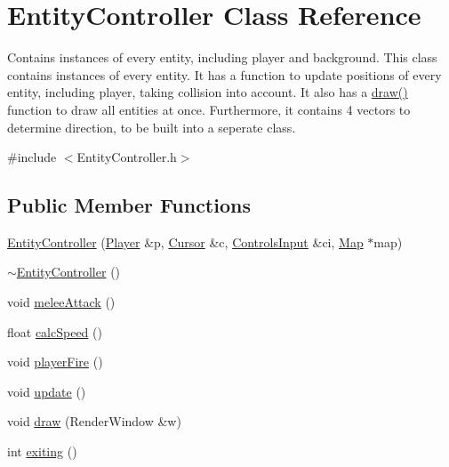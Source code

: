 \hypertarget{class_entity_controller}{}\section{Entity\+Controller Class Reference}
\label{class_entity_controller}


Contains instances of every entity, including player and background. This class contains instances of every entity. It has a function to update positions of every entity, including player, taking collision into account. It also has a \hyperlink{class_entity_controller_a82e17378b1553449be6f93a8c18eefee}{draw()} function to draw all entities at once. Furthermore, it contains 4 vectors to determine direction, to be built into a seperate class.  




{\ttfamily \#include $<$Entity\+Controller.\+h$>$}

\subsection*{Public Member Functions}
\begin{DoxyCompactItemize}
\item 
\hyperlink{class_entity_controller_a2d81c913c30dc661d101c945d67b73b7}{Entity\+Controller} (\hyperlink{class_player}{Player} \&p, \hyperlink{class_cursor}{Cursor} \&c, \hyperlink{struct_controls_input}{Controls\+Input} \&ci, \hyperlink{class_map}{Map} $\ast$map)
\item 
\hyperlink{class_entity_controller_ad55bccfe26fd9a5486a749b2b49a0478}{$\sim$\+Entity\+Controller} ()
\item 
void \hyperlink{class_entity_controller_a8f0223a1a43a2369bc81dd53aadf251c}{melee\+Attack} ()
\item 
float \hyperlink{class_entity_controller_ab847c4e0ddefc7f23b2993c4cdc825a4}{calc\+Speed} ()
\item 
void \hyperlink{class_entity_controller_a1b1859bc8e5bfa72a0f1f34be3b1d5bd}{player\+Fire} ()
\item 
void \hyperlink{class_entity_controller_a3d7a4f7f330f070be70103bd00cf0f16}{update} ()
\item 
void \hyperlink{class_entity_controller_a82e17378b1553449be6f93a8c18eefee}{draw} (Render\+Window \&w)
\item 
int \hyperlink{class_entity_controller_a1df351e4f9a2870a265d07fe8d082efd}{exiting} ()
\end{DoxyCompactItemize}
